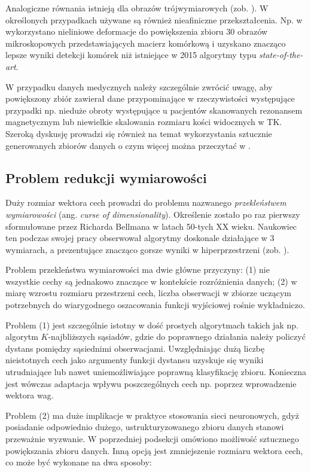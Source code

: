 Analogiczne równania istnieją dla obrazów trójwymiarowych (zob. \cite{Hill06}). W określonych przypadkach używane są również nieafiniczne przekształcenia. Np. w \cite{DBLP:journals/corr/RonnebergerFB15} wykorzystano nieliniowe deformacje do powiększenia zbioru 30 obrazów mikroskopowych przedstawiających macierz komórkową i uzyskano znacząco lepsze wyniki detekcji komórek niż istniejące w 2015 algorytmy typu \textit{state-of-the-art}.

W przypadku danych medycznych należy szczególnie zwrócić uwagę, aby powiększony zbiór zawierał dane przypominające w rzeczywistości występujące przypadki np. nieduże obroty występujące u pacjentów skanowanych rezonansem magnetycznym lub niewielkie skalowania rozmiaru kości widocznych w TK. Szeroką dyskusję prowadzi się również na temat wykorzystania sztucznie generowanych zbiorów danych o czym więcej można przeczytać w \cite{DBLP:journals/corr/SixtWL16, Litjens2017}. 

\subsection{Problem redukcji wymiarowości}

Duży rozmiar wektora cech prowadzi do problemu nazwanego \textit{przekleństwem wymiarowości} (ang. \textit{curse of dimensionality}). Określenie zostało po raz pierwszy sformułowane przez Richarda Bellmana w latach 50-tych XX wieku. Naukowiec ten podczas swojej pracy obserwował algorytmy doskonale działające w 3 wymiarach, a prezentujące znacząco gorsze wyniki w hiperprzestrzeni (zob. \cite{Bellman:1957}). 

Problem przekleństwa wymiarowości ma dwie główne przyczyny: (1) nie wszystkie cechy są jednakowo znaczące w kontekście rozróżnienia danych; (2) w miarę wzrostu rozmiaru przestrzeni cech, liczba obserwacji w zbiorze uczącym potrzebnych do wiarygodnego oszacowania funkcji wyjściowej rośnie wykładniczo.  

Problem (1) jest szczególnie istotny w dość prostych algorytmach takich jak np. algorytm $K$-najbliższych sąsiadów, gdzie do poprawnego działania należy policzyć dystans pomiędzy sąsiednimi obserwacjami. Uwzględniając dużą liczbę nieistotnych cech jako argumenty funkcji dystansu uzyskuje się wyniki utrudniające lub nawet uniemożliwiające poprawną klasyfikację zbioru. Konieczna jest wówczas adaptacja wpływu poszczególnych cech np. poprzez wprowadzenie wektora wag.

Problem (2) ma duże implikacje w praktyce stosowania sieci neuronowych, gdyż posiadanie odpowiednio dużego, ustrukturyzowanego zbioru danych stanowi przeważnie wyzwanie. W poprzedniej podsekcji omówiono możliwość sztucznego powiększania zbioru danych. Inną opcją jest zmniejszenie rozmiaru wektora cech, co może być wykonane na dwa sposoby:


